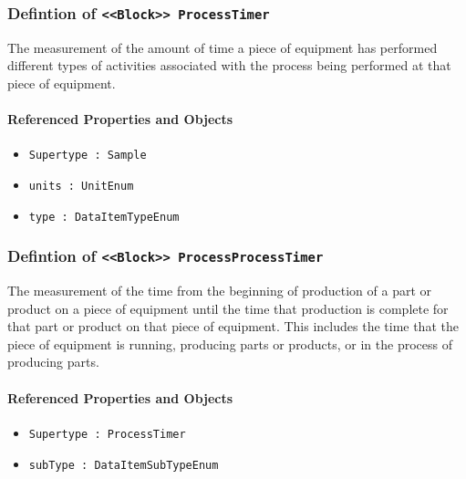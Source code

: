 \subsubsection{Defintion of \texttt{<<Block>> ProcessTimer}}
  \label{type:ProcessTimer}

\FloatBarrier

The measurement of the amount of time a piece of equipment has performed different types of activities associated with the process being performed at that piece of equipment.

\FloatBarrier
\paragraph{Referenced Properties and Objects}

\begin{itemize}
\item \texttt{Supertype : Sample}

\item \texttt{units : UnitEnum}

\item \texttt{type : DataItemTypeEnum}

\end{itemize}
\FloatBarrier
\subsubsection{Defintion of \texttt{<<Block>> ProcessProcessTimer}}
  \label{type:ProcessProcessTimer}

\FloatBarrier

The measurement of the time from the beginning of production of a part or product on a piece of equipment until the time that production is complete for that part or product on that piece of equipment.  This includes the time that the piece of equipment is running, producing parts or products, or in the process of producing parts.

\FloatBarrier
\paragraph{Referenced Properties and Objects}

\begin{itemize}
\item \texttt{Supertype : ProcessTimer}

\item \texttt{subType : DataItemSubTypeEnum}

\end{itemize}
\FloatBarrier
